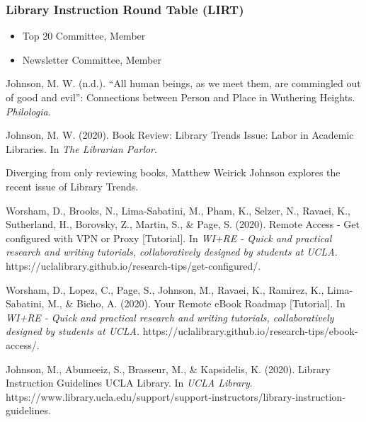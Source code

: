 \documentclass[
  letterpaper,
  DIV=11,
  numbers=noendperiod]{scrartcl}
\providecommand{\tightlist}{%
  \setlength{\itemsep}{0pt}\setlength{\parskip}{0pt}}\usepackage{longtable,booktabs,array}
\newlength{\cslhangindent}
\newenvironment{CSLReferences}[2] %
 {\begin{list}{}{%
  \setlength{\itemindent}{0pt}
  \setlength{\leftmargin}{0pt}
  \setlength{\parsep}{0pt}
  \ifodd #1
   \setlength{\leftmargin}{\cslhangindent}
   \setlength{\itemindent}{-1\cslhangindent}
  \fi
  \setlength{\itemsep}{#2\baselineskip}}}
 {\end{list}}
\newcommand{\CSLBlock}[1]{\hfill\break\parbox[t]{\linewidth}{\strut\ignorespaces#1\strut}}
\begin{document}
\subsubsection{Library Instruction Round Table
(LIRT)}\label{library-instruction-round-table-lirt}

\begin{itemize}
\tightlist
\item
  Top 20 Committee, Member
\item
  Newsletter Committee, Member
\end{itemize}

\label{refs}
\begin{CSLReferences}{1}{0}
Johnson, M. W. (n.d.). {``{All} human beings, as we meet them, are
commingled out of good and evil''}: {Connections} between {Person} and
{Place} in {Wuthering Heights}. \emph{Philologia}.

Johnson, M. W. (2020). Book {Review}: {Library Trends Issue}: {Labor} in
{Academic Libraries}. In \emph{The Librarian Parlor}.
\CSLBlock{Diverging from only reviewing books, Matthew Weirick Johnson
explores the recent issue of Library Trends.}

Worsham, D., Brooks, N., Lima-Sabatini, M., Pham, K., Selzer, N.,
Ravaei, K., Sutherland, H., Borovsky, Z., Martin, S., \& Page, S.
(2020). Remote {Access} - {Get} configured with {VPN} or {Proxy}
{[}Tutorial{]}. In \emph{WI+RE - Quick and practical research and
writing tutorials, collaboratively designed by students at UCLA.}
https://uclalibrary.github.io/research-tips/get-configured/.

Worsham, D., Lopez, C., Page, S., Johnson, M., Ravaei, K., Ramirez, K.,
Lima-Sabatini, M., \& Bicho, A. (2020). Your {Remote eBook Roadmap}
{[}Tutorial{]}. In \emph{WI+RE - Quick and practical research and
writing tutorials, collaboratively designed by students at UCLA.}
https://uclalibrary.github.io/research-tips/ebook-access/.

Johnson, M., Abumeeiz, S., Brasseur, M., \& Kapsidelis, K. (2020).
Library {Instruction Guidelines} {\textbar} {UCLA Library}. In
\emph{UCLA Library}.
https://www.library.ucla.edu/support/support-instructors/library-instruction-guidelines.


\end{CSLReferences}
\end{document}

